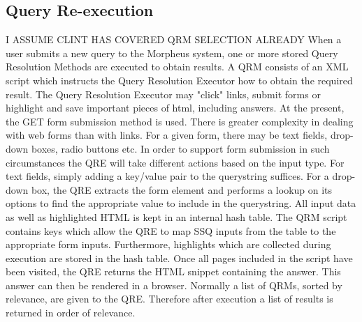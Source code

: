 \subsection{Query Re-execution}
	I ASSUME CLINT HAS COVERED QRM SELECTION ALREADY
	When a user submits a new query to the Morpheus system, one or more stored 
Query Resolution Methods are executed to obtain results. A QRM consists of an XML script which instructs the Query Resolution Executor how to obtain the required result. The Query Resolution Executor may "click" links, submit forms or highlight and save important pieces of html, including answers. At the present, the GET form submission method is used. 
	There is greater complexity in dealing with web forms than with links. For a given
form, there may be text fields, drop-down boxes, radio buttons etc. In order to support form submission in such circumstances the QRE will take different actions based on the input type. For text fields, simply adding a key/value pair to the querystring suffices. For a drop-down box, the QRE extracts the form element and performs a lookup on its options to find the appropriate value to include in the querystring. 
	All input data as well as highlighted HTML is kept in an internal hash table. The QRM script contains keys which allow the QRE to map SSQ inputs from the table to the appropriate form inputs. Furthermore, highlights which are collected during execution are stored in the hash table. 
	Once all pages included in the script have been visited, the QRE returns the HTML snippet containing the answer. This answer can then be rendered in a browser. Normally a list of QRMs, sorted by relevance, are given to the QRE. Therefore after execution a list of results is returned in order of relevance. 